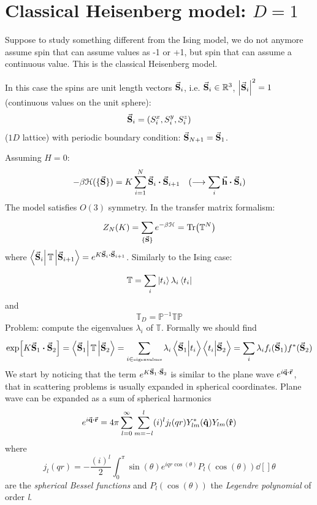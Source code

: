 \documentclass[../main/main.tex]{subfiles}
\begin{document}
\section{Classical Heisenberg model: \( D=1 \)}

Suppose to study something different from the Ising model, we do not anymore assume spin that can assume values as -1 or +1, but spin that can assume a continuous value. This is the classical Heisenberg model.

In this case the spins are unit length vectors \( \va{S}_i \), i.e. \( \va{S}_i \in \mathbb{R}^3 \), \( \abs{\va{S}_i}^2 = 1 \) (continuous values on the unit sphere):
\begin{equation}
  \va{S}_i = ( S_i^x,S_i^y,S_i^z)
\end{equation}
(\( 1D \)  lattice) with periodic boundary condition: \( \va{S}_{N+1} = \va{S}_1 \).

Assuming \( H=0 \):
\begin{equation}
  - \beta \mathcal{H} ( \{ \va{S} \}  ) = K \sum_{i=1}^{N} \va{S}_i \vdot \va{S}_{i+1} \quad  (\longrightarrow \sum_{i}^{} \va{h} \vdot \va{S}_i  )
\end{equation}
The model satisfies \( O(3) \) symmetry. In the transfer matrix formalism:
\begin{equation}
  Z_N (K) = \sum_{\{ \va{S} \}  }^{} e^{-\beta \mathcal{H}}  = \Tr(\mathbb{T}^N)
\end{equation}
where \( \bra{\va{S}_i} \mathbb{T} \ket{\va{S}_{i+1}} = e^{K \va{S}_i \vdot \va{S}_{i+1}} \).
Similarly to the Ising case:
\begin{equation}
  \mathbb{T} = \sum_{i}^{} \ket{t_i} \lambda _i \bra{t_i}
\end{equation}
and
\begin{equation}
  \mathbb{T}_D = \mathbb{P}^{-1} \mathbb{T}\mathbb{P}
\end{equation}
Problem: compute the eigenvalues \( \lambda _i \) of \( \mathbb{T} \).
Formally we should find
\begin{equation}
  \exp [K \va{S}_1\vdot \va{S}_{2}] = \bra{\va{S}_1} \mathbb{T} \ket{\va{S}_2} = \sum_{i \in \text{\tiny eigenvalues}}^{} \lambda _i \braket{\va{S}_1}{t_i}  \braket{t_i}{\va{S}_2}
  = \sum_{i}^{} \lambda _i f_i ( \va{S}_1) f^* (\va{S}_2)
\end{equation}
We start by noticing that the term \( e^{K \va{S}_1 \cdot \va{S}_2}  \) is similar to the plane wave \(e^{i \va{q}\vdot \va{r}}  \), that in scattering problems is usually expanded in spherical coordinates. Plane wave can be expanded as a sum of spherical harmonics
\begin{equation}
  e^{i \va{q}\vdot \va{r}} = 4 \pi \sum_{l=0}^{\infty } \sum_{m=-l}^{l} (i)^l j_l (qr) Y_{lm}^* (\vu{q}) Y_{lm} (\vu{r})
\end{equation}
where
\begin{equation}
  j_l (qr) = - \frac{(i)^l}{2} \int_{0}^{\pi} \sin(\theta ) e^{i q r \cos(\theta ) } P_l (\cos(\theta ) ) \dd[]{\theta }
\end{equation}
are the \emph{spherical Bessel functions} and  \( P_l (\cos(\theta ) ) \) the \emph{Legendre polynomial} of order \emph{l}.
\end{document}
